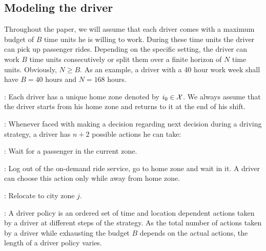 \subsection{Modeling the driver}
Throughout the paper, we will assume that 
each driver comes with a 
maximum budget of $B$ time units
he is willing to work. During these time units the driver 
 can pick
up passenger rides. Depending on the specific setting, the driver can
work $B$ time units consecutively or split them 
over a finite horizon of $N$ time units. Obviously, $N \geq B$. 
As an example, a driver with a 40 hour work week
shall have $B=40$ hours and $N=168$ hours.


: 
Each driver has a unique home zone denoted by $i_0 \in \mathcal{X}$. 
We always assume that the driver starts from his home zone and returns to it
at the end of his shift.

: 
Whenever faced with making a decision regarding next decision during a driving strategy, a driver has $n+2$ possible actions he can take: 
\squishlist
	\item {\getpassenger} \getpassengeraction: Wait for a passenger in the current zone. 
	\item {\gohome} \gohomeaction: Log out of the on-demand ride service, go to home zone and wait in it. A driver can
	choose this action only while away from home zone.
	\item {\relocate} \relocateaction: Relocate to city zone $j$.
\squishend


:
A driver policy is an ordered set of time and location dependent actions taken by a driver at different steps of the strategy. As the total number of actions taken by a driver while exhausting the budget $B$ depends on the actual actions, the length
of a driver policy {\policy} varies. 

